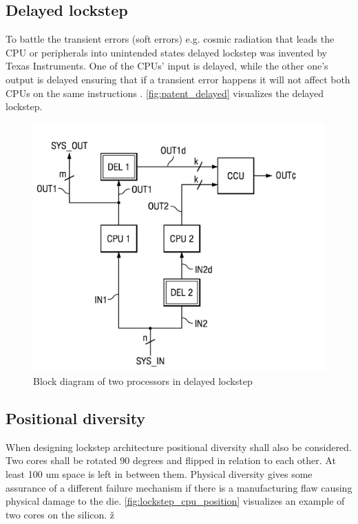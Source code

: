 \subsection{Delayed lockstep}
 
To battle the transient errors (soft errors) e.g. cosmic radiation that leads the CPU or peripherals into unintended states delayed lockstep was invented by Texas Instruments. One of the CPUs' input is delayed, while the other one's output is delayed ensuring that if a transient error happens it will not affect both CPUs on the same instructions \citep{patent_delayed_lockstep}. \autoref{fig:patent_delayed} visualizes the delayed lockstep.

\begin{figure}[H]

      \centering
      \includegraphics[width=0.8\linewidth]{images/patent_delayed.png}
      \caption{Block diagram of two processors in delayed lockstep}
      \label{fig:patent_delayed}
    
\end{figure}

\subsection{Positional diversity}

When designing lockstep architecture positional diversity shall also be considered. Two cores shall be rotated 90 degrees and flipped in relation to each other. At least 100 um space is left in between them. Physical diversity gives some assurance of a different failure mechanism if
there is a manufacturing flaw causing physical damage to the die. \autoref{fig:lockstep_cpu_position} visualizes an example of two cores on the silicon. ž

